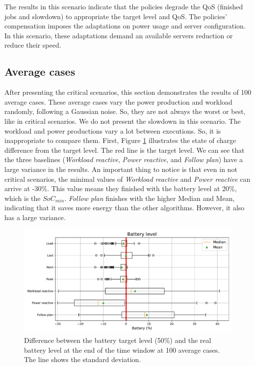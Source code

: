 The results in this scenario indicate that the policies degrade the QoS (finished jobs and slowdown) to appropriate the target level and QoS. The policies' compensation imposes the adaptations on power usage and server configuration. In this scenario, these adaptations demand an available servers reduction or reduce their speed. 

\clearpage

\subsection{Average cases}

After presenting the critical scenarios, this section demonstrates the results of 100 average cases. These average cases vary the power production and workload randomly, following a Gaussian noise. So, they are not always the worst or best, like in critical scenarios. We do not present the slowdown in this scenario. The workload and power productions vary a lot between executions. So, it is inappropriate to compare them. First, Figure \ref{fig:SoC_diff} illustrates the state of charge difference from the target level. The red line is the target level. We can see that the three baselines (\emph{Workload reactive}, \emph{Power reactive}, and \emph{Follow plan}) have a large variance in the results. An important thing to notice is that even in not critical scenarios, the minimal values of \emph{Workload reactive} and \emph{Power reactive} can arrive at -30\%. This value means they finished with the battery level at 20\%, which is the $SoC_{min}$. \emph{Follow plan} finishes with the higher Median and Mean, indicating that it saves more energy than the other algorithms. However, it also has a large variance.

\begin{figure}[!htb]
    \centering
    \includegraphics[scale=0.55]{Images/Compensations/battery_diff.pdf}
    \caption{Difference between the battery target level (50\%) and the real battery level at the end of the time window at 100 average cases. The line shows the standard deviation.}
    \label{fig:SoC_diff}
\end{figure}

